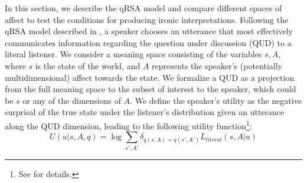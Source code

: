 \documentclass[10pt,letterpaper]{article}
\begin{document}
In this section, we describe the qRSA model and compare different spaces of affect to test the conditions for producing ironic interpretations. 
%
%
%
Following the qRSA model described in , a speaker chooses an utterance that most effectively communicates information regarding the question under discussion (QUD) to a literal listener. We consider a meaning space consisting of the variables $s, A$, where $s$ is the state of the world, and $A$ represents the speaker's (potentially multidimensional) affect towards the state. 
We formalize a QUD as a projection from the full meaning space to the subset of interest to the speaker, which could be $s$ or any of the dimensions of $A$. 
We define the speaker's utility as the negative surprisal of the true state under the listener's distribution given an utterance along the QUD dimension, leading to the following utility function\footnote{See  for details.}:
%
\begin{equation}
U(u | s, A, q) = \log \sum_{s', A'} \delta_{q(s, A)=q(s', A')} L_{literal}(s, A |u)
\end{equation}
\end{document}

